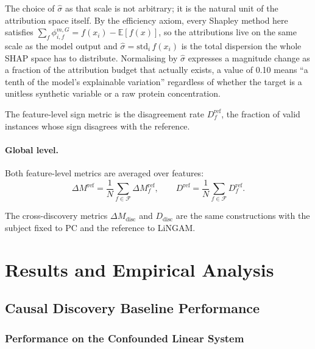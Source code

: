 \documentclass[12pt,a4paper,oneside]{article}
\begin{document}
The choice of $\hat{\sigma}$ as that scale is not arbitrary; it is the natural unit of the attribution space itself. By the efficiency axiom, every Shapley method here satisfies $\sum_{f} \phi^{m,G}_{i,f} = f(x_i) - \mathbb{E}[f(x)]$, so the attributions live on the same scale as the model output and $\hat{\sigma} = \mathrm{std}_{i}\, f(x_i)$ is the total dispersion the whole SHAP space has to distribute. Normalising by $\hat{\sigma}$ expresses a magnitude change as a fraction of the attribution budget that actually exists, a value of 0.10 means ``a tenth of the model's explainable variation'' regardless of whether the target is a unitless synthetic variable or a raw protein concentration.

The feature-level sign metric is the disagreement rate $D^{\mathrm{ref}}_f$, the fraction of valid instances whose sign disagrees with the reference.

\paragraph{Global level.}
Both feature-level metrics are averaged over features:
\begin{equation}
  \Delta M^{\mathrm{ref}} = \frac{1}{N}\sum_{f \in \mathcal{F}} \Delta M^{\mathrm{ref}}_f,
  \qquad
  D^{\mathrm{ref}} = \frac{1}{N}\sum_{f \in \mathcal{F}} D^{\mathrm{ref}}_f.
\end{equation}

The cross-discovery metrics $\Delta M_{\text{disc}}$ and $D_{\text{disc}}$ are the same constructions with the subject fixed to PC and the reference to LiNGAM.

\section{Results and Empirical Analysis}
\label{sec:results}

\subsection{Causal Discovery Baseline Performance}

\subsubsection{Performance on the Confounded Linear System}
\end{document}
